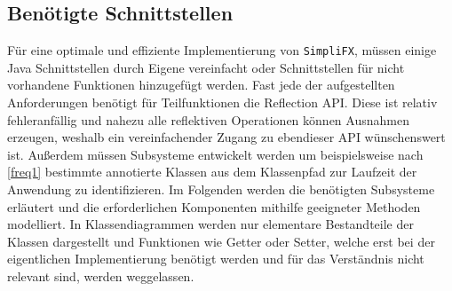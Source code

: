 \subsection{Benötigte Schnittstellen}
Für eine optimale und effiziente Implementierung von \texttt{SimpliFX}, müssen einige Java Schnittstellen durch Eigene vereinfacht oder Schnittstellen für nicht vorhandene Funktionen hinzugefügt werden. Fast jede der aufgestellten Anforderungen benötigt für Teilfunktionen die Reflection API. Diese ist relativ fehleranfällig und nahezu alle reflektiven Operationen können Ausnahmen erzeugen, weshalb ein vereinfachender Zugang zu ebendieser API wünschenswert ist. Außerdem müssen Subsysteme entwickelt werden um beispielsweise nach \autoref{freq1} bestimmte annotierte Klassen aus dem Klassenpfad zur Laufzeit der Anwendung zu identifizieren.
Im Folgenden werden die benötigten Subsysteme erläutert und die erforderlichen Komponenten mithilfe geeigneter Methoden modelliert. In Klassendiagrammen werden nur elementare Bestandteile der Klassen dargestellt und Funktionen wie Getter oder Setter, welche erst bei der eigentlichen Implementierung benötigt werden und für das Verständnis nicht relevant sind, werden weggelassen.
